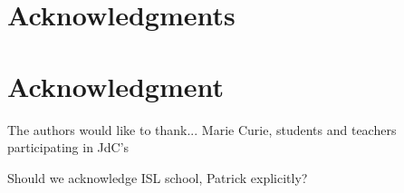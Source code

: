 \documentclass[10pt,journal,compsoc]{IEEEtran}
\begin{document}
\ifCLASSOPTIONcompsoc
  \section*{Acknowledgments}
\else
  \section*{Acknowledgment}
\fi


The authors would like to thank... Marie Curie, students and teachers participating in JdC's

Should we acknowledge ISL school, Patrick explicitly?


\ifCLASSOPTIONcaptionsoff
  \newpage
\fi







%
%

% 
\end{document}
